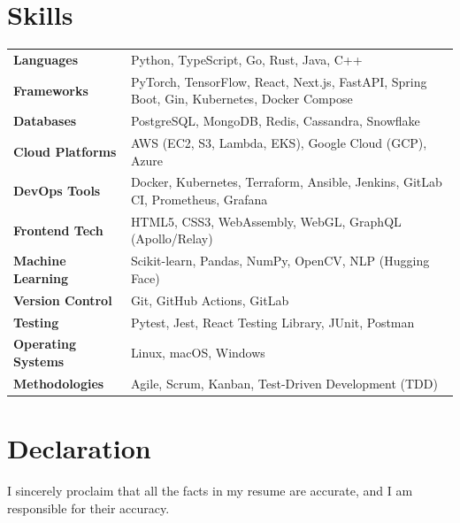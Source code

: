 \documentclass[letterpaper,10pt]{article}
\begin{document}
\section{Skills}
\begin{tabularx}{\textwidth}{@{} l X @{} }
\textbf{Languages} \hspace{1em} & Python, TypeScript, Go, Rust, Java, C++ \\
\textbf{Frameworks} \hspace{1em} & PyTorch, TensorFlow, React, Next.js, FastAPI, Spring Boot, Gin, Kubernetes, Docker Compose \\
\textbf{Databases} \hspace{1em} & PostgreSQL, MongoDB, Redis, Cassandra, Snowflake \\
\textbf{Cloud Platforms} \hspace{1em} & AWS (EC2, S3, Lambda, EKS), Google Cloud (GCP), Azure \\
\textbf{DevOps Tools} \hspace{1em} & Docker, Kubernetes, Terraform, Ansible, Jenkins, GitLab CI, Prometheus, Grafana \\
\textbf{Frontend Tech} \hspace{1em} & HTML5, CSS3, WebAssembly, WebGL, GraphQL (Apollo/Relay) \\
\textbf{Machine Learning} \hspace{1em} & Scikit-learn, Pandas, NumPy, OpenCV, NLP (Hugging Face) \\
\textbf{Version Control} \hspace{1em} & Git, GitHub Actions, GitLab \\
\textbf{Testing} \hspace{1em} & Pytest, Jest, React Testing Library, JUnit, Postman \\
\textbf{Operating Systems} \hspace{1em} & Linux, macOS, Windows \\
\textbf{Methodologies} \hspace{1em} & Agile, Scrum, Kanban, Test-Driven Development (TDD) \\
\end{tabularx}


\section{Declaration}
\vspace{-1pt}
\noindent
I sincerely proclaim that all the facts in my resume are accurate, and I am responsible for their accuracy.
\end{document}
